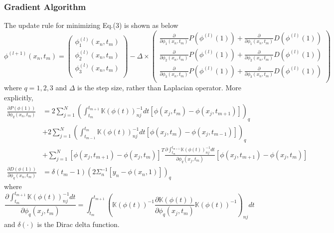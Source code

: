 \documentclass{article}
\theoremstyle{definition}
\theoremstyle{plain}
\begin{document}
\subsubsection{Gradient Algorithm}
The update rule for minimizing Eq.(3) is shown as below
\begin{equation*}
    \phi^{(l+1)}(x_n,t_m)=
    \begin{pmatrix}
    \phi_1^{(l)}(x_n,t_m)\\
    \phi_2^{(l)}(x_n,t_m)\\
    \phi_3^{(l)}(x_n,t_m)\\
    \end{pmatrix}-
    \Delta\times
    \begin{pmatrix}
    \frac{\partial}{\partial\phi_1(x_n,t_m)}P(\phi^{(l)}(1))+\frac{\partial}{\partial\phi_1(x_n,t_m)}D(\phi^{(l)}(1))\\
    \frac{\partial}{\partial\phi_2(x_n,t_m)}P(\phi^{(l)}(1))+\frac{\partial}{\partial\phi_2(x_n,t_m)}D(\phi^{(l)}(1))\\
    \frac{\partial}{\partial\phi_3(x_n,t_m)}P(\phi^{(l)}(1))+\frac{\partial}{\partial\phi_3(x_n,t_m)}D(\phi^{(l)}(1))\\
    \end{pmatrix}
\end{equation*}
where $q=1,2,3$ and $\Delta$ is the step size, rather than Laplacian operator. More explicitly,
\begin{align*}
    \frac{\partial P(\phi(1))}{\partial\phi_q(x_n,t_m)}&=2\sum^N_{j=1}\left(\int^{t_{m+1}}_{t_m}\mathbb{K}(\phi(t))^{-1}_{nj}dt[\phi(x_j,t_m)-\phi(x_j,t_{m+1})]\right)_q\\
    &+2\sum^N_{j=1}\left(\int^{t_m}_{t_{m-1}}\mathbb{K}(\phi(t))^{-1}_{nj}dt[\phi(x_j,t_m)-\phi(x_j,t_{m-1})]\right)_q\\
    &+\sum^N_{j=1}[\phi(x_j,t_{m+1})-\phi(x_j,t_m)]^T\frac{\partial\int^{t_{m+1}}_{t_m}\mathbb{K}(\phi(t))^{-1}_{nj}dt}{\partial\phi_q(x_j,t_m)}[\phi(x_j,t_{m+1})-\phi(x_j,t_m)]\\
    \frac{\partial D(\phi(1))}{\partial\phi_q(x_n,t_m)}&=\delta(t_m-1)(2\Sigma^{-1}_n[y_n-\phi(x_n,1)])_q
\end{align*}
where
\begin{equation*}
    \frac{\partial\int^{t_{m+1}}_{t_m}\mathbb{K}(\phi(t))^{-1}_{nj}dt}{\partial\phi_q(x_j,t_m)}=\int^{t_{m+1}}_{t_m}\left(\mathbb{K}(\phi(t))^{-1}\frac{\partial\mathbb{K}(\phi(t))}{\partial\phi_q(x_j,t_m)}\mathbb{K}(\phi(t))^{-1}\right)_{nj}dt
\end{equation*}
and $\delta(\cdot)$ is the Dirac delta function.
\end{document}
